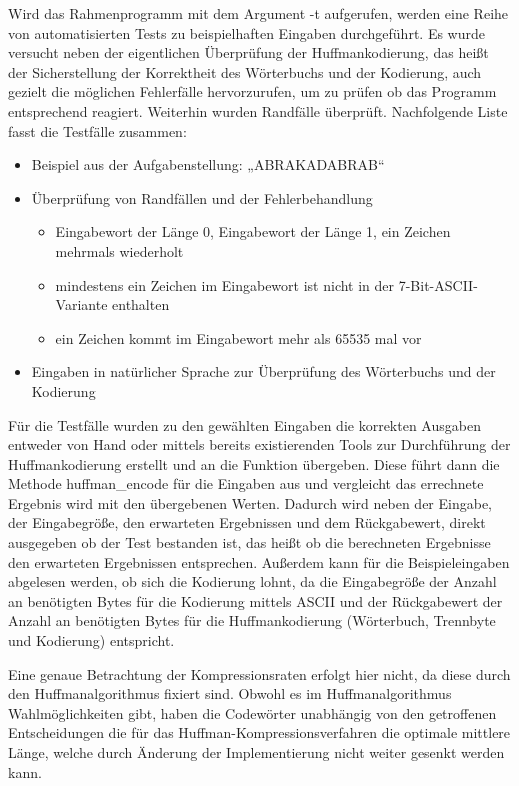 \documentclass[course=erap]{aspdoc}
\begin{document}
Wird das Rahmenprogramm mit dem Argument -t aufgerufen, werden eine Reihe von automatisierten Tests zu beispielhaften Eingaben durchgeführt. Es wurde versucht neben der eigentlichen Überprüfung der Huffmankodierung, das heißt der Sicherstellung der Korrektheit des Wörterbuchs und der Kodierung, auch gezielt die möglichen Fehlerfälle hervorzurufen, um zu prüfen ob das Programm entsprechend reagiert. Weiterhin wurden Randfälle überprüft. Nachfolgende Liste fasst die Testfälle zusammen:
\begin{itemize}
\item{Beispiel aus der Aufgabenstellung: „ABRAKADABRAB“}
\item{Überprüfung von Randfällen und der Fehlerbehandlung}
	\begin{itemize}
	\item{Eingabewort der Länge 0, Eingabewort der Länge 1, ein Zeichen mehrmals wiederholt}
	\item{mindestens ein Zeichen im Eingabewort ist nicht in der 7-Bit-ASCII-Variante enthalten}
	\item{ein Zeichen kommt im Eingabewort mehr als 65535 mal vor}
	\end{itemize}
\item{Eingaben in natürlicher Sprache zur Überprüfung des Wörterbuchs und der Kodierung}
\end{itemize}
Für die Testfälle wurden zu den gewählten Eingaben die korrekten Ausgaben entweder von Hand oder mittels bereits existierenden Tools zur Durchführung der Huffmankodierung erstellt und an die Funktion übergeben. Diese führt dann die Methode huffman\_encode für die Eingaben aus und vergleicht das errechnete Ergebnis wird mit den übergebenen Werten. Dadurch wird neben der Eingabe, der Eingabegröße, den erwarteten Ergebnissen und dem Rückgabewert, direkt ausgegeben ob der Test bestanden ist, das heißt ob die berechneten Ergebnisse den erwarteten Ergebnissen entsprechen. Außerdem kann für die Beispieleingaben abgelesen werden, ob sich die Kodierung lohnt, da die Eingabegröße der Anzahl an benötigten Bytes für die Kodierung mittels ASCII und der Rückgabewert der Anzahl an benötigten Bytes für die Huffmankodierung (Wörterbuch, Trennbyte und Kodierung) entspricht.


Eine genaue Betrachtung der Kompressionsraten erfolgt hier nicht, da diese durch den Huffmanalgorithmus fixiert sind. Obwohl es im Huffmanalgorithmus Wahlmöglichkeiten gibt, haben die Codewörter unabhängig von den getroffenen Entscheidungen die für das Huffman-Kompressionsverfahren die optimale mittlere Länge, welche durch Änderung der Implementierung nicht weiter gesenkt werden kann.\cite{codierungstheorieVT}
\end{document}
